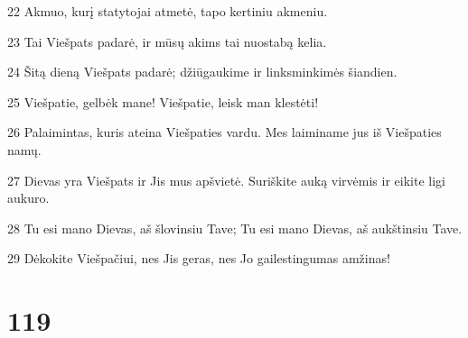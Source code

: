\par 22 Akmuo, kurį statytojai atmetė, tapo kertiniu akmeniu. 
\par 23 Tai Viešpats padarė, ir mūsų akims tai nuostabą kelia. 
\par 24 Šitą dieną Viešpats padarė; džiūgaukime ir linksminkimės šiandien. 
\par 25 Viešpatie, gelbėk mane! Viešpatie, leisk man klestėti! 
\par 26 Palaimintas, kuris ateina Viešpaties vardu. Mes laiminame jus iš Viešpaties namų. 
\par 27 Dievas yra Viešpats ir Jis mus apšvietė. Suriškite auką virvėmis ir eikite ligi aukuro. 
\par 28 Tu esi mano Dievas, aš šlovinsiu Tave; Tu esi mano Dievas, aš aukštinsiu Tave. 
\par 29 Dėkokite Viešpačiui, nes Jis geras, nes Jo gailestingumas amžinas!


\chapter{119}


